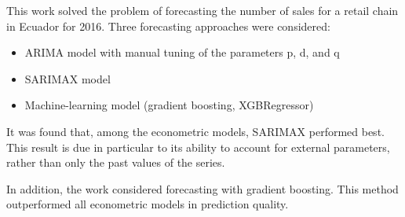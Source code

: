 \documentclass[]{article}
\begin{document}
This work solved the problem of forecasting the number of sales for a retail chain in Ecuador for 2016. Three forecasting approaches were considered:
\begin{itemize}
	\item ARIMA model with manual tuning of the parameters p, d, and q
	\item SARIMAX model
	\item Machine-learning model (gradient boosting, XGBRegressor)
\end{itemize}

It was found that, among the econometric models, SARIMAX performed best. This result is due in particular to its ability to account for external parameters, rather than only the past values of the series.

In addition, the work considered forecasting with gradient boosting. This method outperformed all econometric models in prediction quality.
\end{document}

